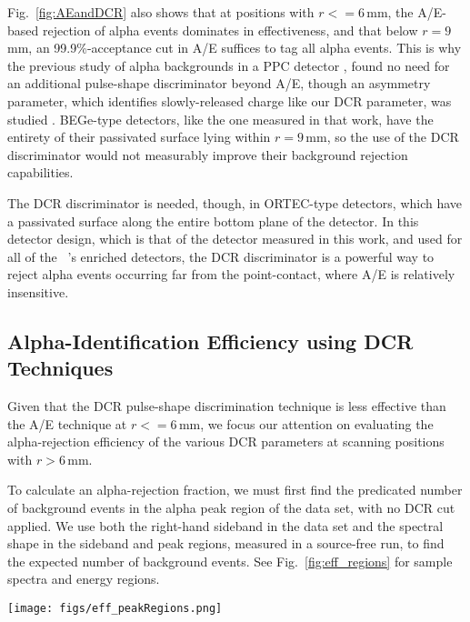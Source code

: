 \documentclass[groupedaddress,rmp,amsmath,amssymb,bibnotes,altaffilletter,twocolumn]{revtex4-1}
\begin{document}
Fig.~\ref{fig:AEandDCR} also shows that at positions with $r<= 6$\,mm, the A/E-based rejection of alpha events dominates in effectiveness, and that below $r=9$\,mm, an 99.9\%-acceptance cut in A/E suffices to tag all alpha events. This is why the previous study of alpha backgrounds in a PPC detector \cite{Agostini_thesis}, found no need for an additional pulse-shape discriminator beyond A/E, though an asymmetry parameter, which identifies slowly-released charge like our DCR parameter, was studied \cite{TUBEdoc?}. BEGe-type detectors, like the one measured in that work, have the entirety of their passivated surface lying within $r=9$\,mm, so the use of the DCR discriminator would not measurably improve their background rejection capabilities. 

The DCR discriminator is needed, though, in ORTEC-type detectors, which have a passivated surface along the entire bottom plane of the detector. In this detector design, which is that of the detector measured in this work, and used for all of the \MJ\ \DEM 's enriched detectors, the DCR discriminator is a powerful way to reject alpha events occurring far from the point-contact, where A/E is relatively insensitive. 

\subsection{Alpha-Identification Efficiency using DCR Techniques}
Given that the DCR pulse-shape discrimination technique is less effective than the A/E technique at $r<=6$\,mm, we focus our attention on evaluating the alpha-rejection efficiency of the various DCR parameters at scanning positions with $r>6$\,mm. 

To calculate an alpha-rejection fraction, we must first find the predicated number of background events in the alpha peak region of the data set, with no DCR cut applied. We use both the right-hand sideband in the data set and the spectral shape in the sideband and peak regions, measured in a source-free run, to find the expected number of background events. See Fig.~\ref{fig:eff_regions} for sample spectra and energy regions. 

\begin{figure*}[]
 \centering
 \texttt{[image: figs/eff\_peakRegions.png]}
 \caption{Energy spectra for a source scan data set with $r=9$\,mm {\it (left)} and a background data set {\it (right)}. The energy windows indicated are the $5\sigma$ peak region, in red, and the 500\,keV right-hand sideband, in blue. $n_{s, pk}$ is the sum of all events in the red solid-lined box and $n_{s, rh}$ is the sum of all the events in the blue solid-lined box. $n_{b, pk}$ and $n_{b, rh}$ are the sum of events in the red and blue dashed-line boxes, respectively.} 
 \label{fig:eff_regions}
\end{figure*}
\end{document}
